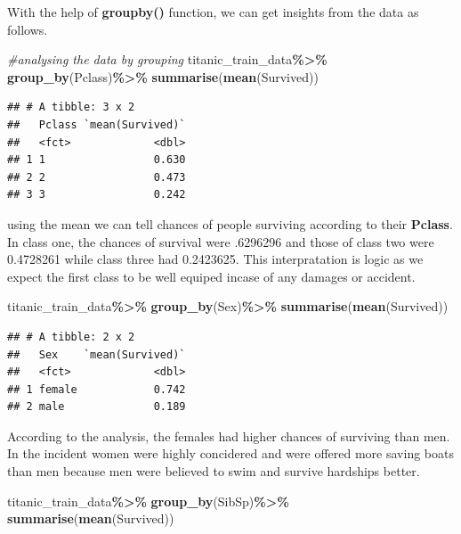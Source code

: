 \documentclass[
]{article}
\newenvironment{Shaded}{\begin{snugshade}}{\end{snugshade}}
\newcommand{\CommentTok}[1]{\textcolor[rgb]{0.56,0.35,0.01}{\textit{#1}}}
\newcommand{\FunctionTok}[1]{\textcolor[rgb]{0.13,0.29,0.53}{\textbf{#1}}}
\newcommand{\NormalTok}[1]{#1}
\newcommand{\SpecialCharTok}[1]{\textcolor[rgb]{0.81,0.36,0.00}{\textbf{#1}}}
\begin{document}
With the help of \textbf{groupby()} function, we can get insights from
the data as follows.

\begin{Shaded}
\begin{Highlighting}[]
\CommentTok{\#analysing the data by grouping}
\NormalTok{titanic\_train\_data}\SpecialCharTok{\%\textgreater{}\%}
  \FunctionTok{group\_by}\NormalTok{(Pclass)}\SpecialCharTok{\%\textgreater{}\%}
  \FunctionTok{summarise}\NormalTok{(}\FunctionTok{mean}\NormalTok{(Survived))}
\end{Highlighting}
\end{Shaded}

\begin{verbatim}
## # A tibble: 3 x 2
##   Pclass `mean(Survived)`
##   <fct>             <dbl>
## 1 1                 0.630
## 2 2                 0.473
## 3 3                 0.242
\end{verbatim}

using the mean we can tell chances of people surviving according to
their \textbf{Pclass}. In class one, the chances of survival were
.6296296 and those of class two were 0.4728261 while class three had
0.2423625. This interpratation is logic as we expect the first class to
be well equiped incase of any damages or accident.

\begin{Shaded}
\begin{Highlighting}[]
\NormalTok{titanic\_train\_data}\SpecialCharTok{\%\textgreater{}\%}
  \FunctionTok{group\_by}\NormalTok{(Sex)}\SpecialCharTok{\%\textgreater{}\%}
  \FunctionTok{summarise}\NormalTok{(}\FunctionTok{mean}\NormalTok{(Survived))}
\end{Highlighting}
\end{Shaded}

\begin{verbatim}
## # A tibble: 2 x 2
##   Sex    `mean(Survived)`
##   <fct>             <dbl>
## 1 female            0.742
## 2 male              0.189
\end{verbatim}

According to the analysis, the females had higher chances of surviving
than men. In the incident women were highly concidered and were offered
more saving boats than men because men were believed to swim and survive
hardships better.

\begin{Shaded}
\begin{Highlighting}[]
\NormalTok{titanic\_train\_data}\SpecialCharTok{\%\textgreater{}\%}
  \FunctionTok{group\_by}\NormalTok{(SibSp)}\SpecialCharTok{\%\textgreater{}\%}
  \FunctionTok{summarise}\NormalTok{(}\FunctionTok{mean}\NormalTok{(Survived))}
\end{Highlighting}
\end{Shaded}
\end{document}
